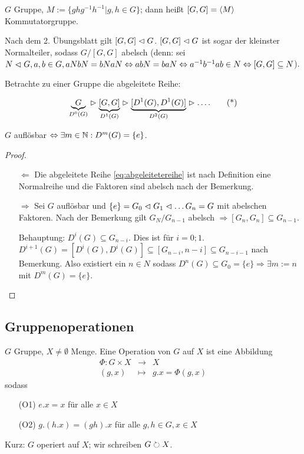 \documentclass[12pt,a4paper]{scrartcl}
\begin{document}
\begin{defi}
	$G$ Gruppe, $M := \{ghg^{-1}h^{-1}|g,h\in G\}$; dann heißt $[G,G] = \langle M\rangle$ Kommutatorgruppe.
\end{defi}

\begin{bem}
	Nach dem 2. Übungsblatt gilt $[G,G] \vartriangleleft G$. $[G,G]\vartriangleleft G$ ist sogar  der kleinster Normalteiler, sodass $G/[G,G]$ abelsch (denn: sei $N\vartriangleleft G, a,b\in G, aNbN = bNaN\Leftrightarrow abN = baN\Leftrightarrow a^{-1}b^{-1}ab\in N\Leftrightarrow [G,G]\subseteq N$).
\end{bem}

\noindent
Betrachte zu einer Gruppe die abgeleitete Reihe:

\begin{equation}
\underbrace{G}_{D^0(G)} \vartriangleright \underbrace{[G,G]}_{D^1(G)} \vartriangleright \underbrace{[D^1(G),D^1(G)]}_{D^2(G)} \vartriangleright \ldots . \tag{*}\label{eq:abgeleitetereihe}
\end{equation}

\begin{satz}[Satz 4.2]
	$G$ auflösbar $\Leftrightarrow \exists m\in\mathbb N : D^m(G) = \{e\}$.
\end{satz}
\begin{proof}
	\leavevmode
	\begin{itemize}
		\item [\glqq $\Leftarrow$\grqq] Die abgeleitete Reihe \eqref{eq:abgeleitetereihe} ist nach Definition eine Normalreihe und die Faktoren sind abelsch nach der Bemerkung.
		\item [\glqq $\Rightarrow$\grqq] Sei $G$ auflösbar und $\{e\} = G_0\vartriangleleft G_1\vartriangleleft\dots G_n = G$ mit abelschen Faktoren. Nach der Bemerkung gilt $G_N/G_{n-1}$ abelsch $\Rightarrow [G_n,G_n]\subseteq G_{n-1}$.
		
		Behauptung: $D^i(G) \subseteq G_{n-i}$. Dies ist für $i = 0;1$. $D^{i+1}(G) = [D^i(G), D^i(G)]\subseteq [G_{n-i},{n-i}]\subseteq G_{n-i-1}$ nach Bemerkung. Also existiert ein $n\in N$ sodass $D^n(G) \subseteq G_0 = \{e\}\Rightarrow \exists m:=n$ mit $D^m(G) =\{e\}$.	
	\end{itemize}
\end{proof}


\subsection{Gruppenoperationen}
\begin{defi}
	$G$ Gruppe, $X\neq \emptyset$ Menge. Eine Operation von $G$ auf $X$ ist eine Abbildung
	\begin{eqnarray*}
		\Phi\colon G\times X &\to & X\\
		(g,x) &\mapsto & g.x = \Phi(g,x)
	\end{eqnarray*}
	sodass
	\begin{itemize}
		\item[(O1)] $e.x = x$ für alle $x\in X$
		\item[(O2)] $g.(h.x) = (gh).x$ für alle $g,h\in G, x\in X$
	\end{itemize}
	Kurz: $G$ operiert auf $X$; wir schreiben $G\circlearrowright X$.
\end{defi}
\end{document}
